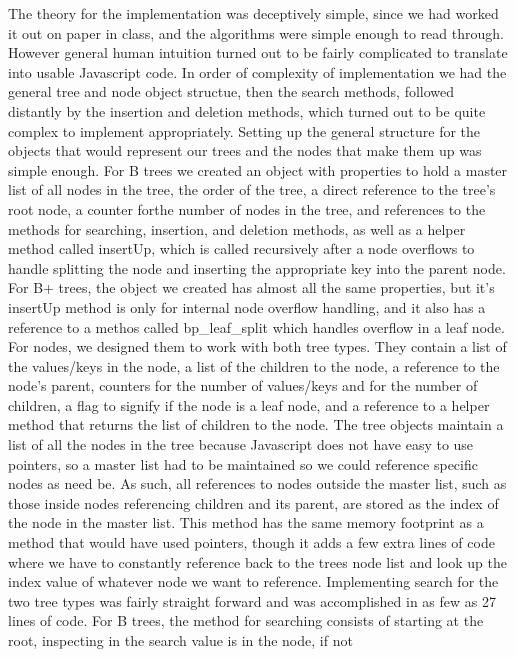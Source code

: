 The theory for the implementation was deceptively simple, since we had worked it out on paper in class, 
and the algorithms were simple enough to read through.  However general human intuition turned out to 
be fairly complicated to translate into usable Javascript code.  In order of complexity of implementation 
we had the general tree and node object structue, then the search methods, followed distantly by the insertion 
and deletion methods, which turned out to be quite complex to implement appropriately.
    Setting up the general structure for the objects that would represent our trees and the nodes that make them up 
was simple enough.  For B trees we created an object with properties to hold a master list of all nodes in the tree, 
the order of the tree, a direct reference to the tree's root node, a counter forthe number of nodes in the tree, and 
references to the methods for searching, insertion, and deletion methods, as well as a helper method called insertUp, 
which is called recursively after a node overflows to handle splitting the node and inserting the appropriate key into 
the parent node.  For B+ trees, the object we created has almost all the same properties, but it's insertUp method is 
only for internal node overflow handling, and it also has a reference to a methos called bp_leaf_split which handles 
overflow in a leaf node.  For nodes, we designed them to work with both tree types.  They contain a list of the values/keys 
in the node, a list of the children to the node, a reference to the node's parent, counters for the number of values/keys 
and for the number of children, a flag to signify if the node is a leaf node, and a reference to a helper method that returns 
the list of children to the node. The tree objects maintain a list of all the nodes in the tree because Javascript does not 
have easy to use pointers, so a master list had to be maintained so we could reference specific nodes as need be.  
As such, all references to nodes outside the master list, such as those inside nodes referencing children and its parent, are stored 
as the index of the node in the master list.  This method has the same memory footprint as a method that would have used pointers, 
though it adds a few extra lines of code where we have to constantly reference back to the trees node list and look up the index value 
of whatever node we want to reference.
    Implementing search for the two tree types was fairly straight forward and was accomplished in as few as 27 lines of code.  
For B trees, the method for searching consists of starting at the root, inspecting in the search value is in the node, if not 
